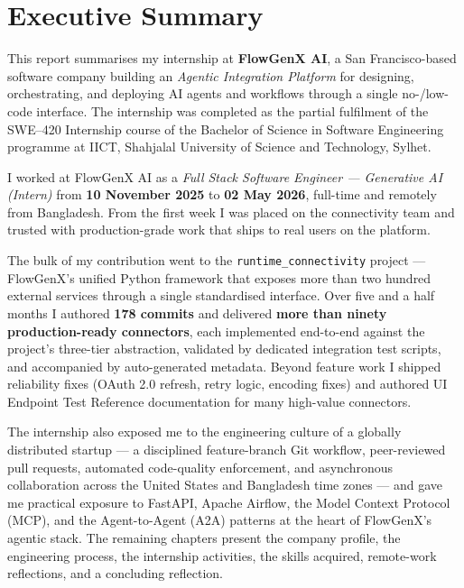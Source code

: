 \chapter*{Executive Summary}

This report summarises my internship at \textbf{FlowGenX AI}, a San
Francisco-based software company building an \emph{Agentic Integration
Platform} for designing, orchestrating, and deploying AI agents and
workflows through a single no-/low-code interface. The internship was
completed as the partial fulfilment of the SWE--420 Internship course
of the Bachelor of Science in Software Engineering programme at IICT,
Shahjalal University of Science and Technology, Sylhet.

I worked at FlowGenX AI as a \emph{Full Stack Software Engineer ---
Generative AI (Intern)} from \textbf{10 November 2025} to
\textbf{02 May 2026}, full-time and remotely from Bangladesh. From
the first week I was placed on the connectivity team and trusted with
production-grade work that ships to real users on the platform.

The bulk of my contribution went to the \texttt{runtime\_connectivity}
project --- FlowGenX's unified Python framework that exposes more than
two hundred external services through a single standardised interface.
Over five and a half months I authored \textbf{178 commits} and
delivered \textbf{more than ninety production-ready connectors}, each
implemented end-to-end against the project's three-tier abstraction,
validated by dedicated integration test scripts, and accompanied by
auto-generated metadata. Beyond feature work I shipped reliability
fixes (OAuth 2.0 refresh, retry logic, encoding fixes) and authored
UI Endpoint Test Reference documentation for many high-value
connectors.

The internship also exposed me to the engineering culture of a
globally distributed startup --- a disciplined feature-branch Git
workflow, peer-reviewed pull requests, automated code-quality
enforcement, and asynchronous collaboration across the United States
and Bangladesh time zones --- and gave me practical exposure to
FastAPI, Apache Airflow, the Model Context Protocol (MCP), and the
Agent-to-Agent (A2A) patterns at the heart of FlowGenX's agentic
stack. The remaining chapters present the company profile, the
engineering process, the internship activities, the skills acquired,
remote-work reflections, and a concluding reflection.
